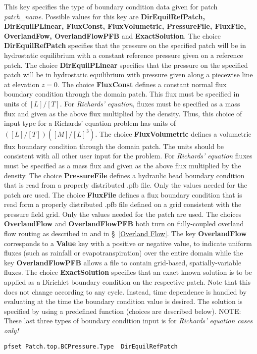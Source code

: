 {This key specifies the type of boundary condition data given for patch 
{\em patch\_name}.  Possible values for this key are {\bf DirEquilRefPatch, 
DirEquilPLinear, FluxConst, FluxVolumetric, PressureFile, FluxFile, OverlandFow, OverlandFlowPFB} and 
{\bf ExactSolution}.  The choice {\bf DirEquilRefPatch} specifies that the
pressure on the specified patch will be in hydrostatic equilibrium with a
constant reference pressure given on a reference patch.
The choice {\bf DirEquilPLinear} specifies that the pressure on the specified
patch will be in hydrostatic equilibrium with pressure given along a piecewise
line at elevation $z=0$.  The choice {\bf FluxConst} defines a constant normal 
flux boundary condition through the domain patch.  
This flux must be specified in units of $[L]/[T]$.
For {\em Richards' equation}, fluxes must be specified as a mass flux and given
as the above flux multiplied by the density.  Thus, this choice of input type
for a Richards' equation problem has units of $([L]/[T])([M]/[L]^3)$.
The choice {\bf FluxVolumetric} defines a volumetric flux boundary condition
through the domain patch.  The units should be consistent with all other
user input for the problem.
For {\em Richards' equation} fluxes must be specified as a mass flux and given
as the above flux multiplied by the density.
The choice {\bf PressureFile} defines a hydraulic head boundary condition that
is read from a properly distributed .pfb file.  Only the values needed for the
patch are used.
The choice {\bf FluxFile} defines a flux boundary condition that is read form a
properly distributed .pfb file defined on a grid consistent with the pressure
field grid.  Only the values needed for the patch are used.
The choices {\bf OverlandFlow} and {\bf OverlandFlowPFB} both turn on fully-coupled overland flow routing as described in \cite{KM06} and in \S~\ref{Overland Flow}.  The key {\bf OverlandFlow} corresponds to a {\bf Value} key with a positive or negative value, to indicate uniform fluxes (such as rainfall or evapotranspiration) over the entire domain while the key {\bf OverlandFlowPFB} allows a  file to contain grid-based, spatially-variable fluxes.
The choice {\bf ExactSolution} specifies that an exact known solution 
is to be applied as a
Dirichlet boundary condition on the respective patch.  Note that this does not
change according to any cycle.  Instead, time dependence is handled by
evaluating at the time the boundary condition value is desired.  
The solution is specified by using a predefined function (choices are described
below).  NOTE: These last three types of boundary condition input is for 
{\em Richards' equation cases only!} 
}
\begin{display}\begin{verbatim}
pfset Patch.top.BCPressure.Type  DirEquilRefPatch
\end{verbatim}\end{display}

